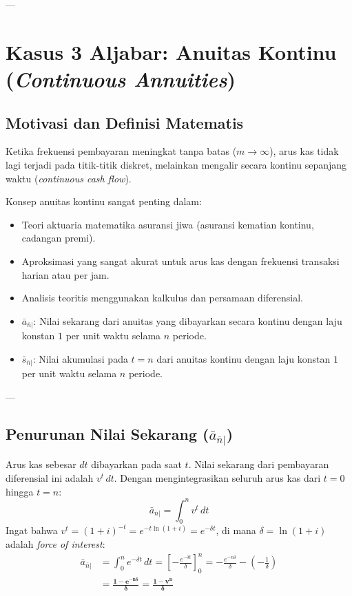 \documentclass[11pt,a4paper]{article}
\begin{document}
---

\section{Kasus 3 Aljabar: Anuitas Kontinu (\textit{Continuous Annuities})}

\subsection{Motivasi dan Definisi Matematis}
Ketika frekuensi pembayaran meningkat tanpa batas ($m \to \infty$), arus kas tidak lagi terjadi pada titik-titik diskret, melainkan mengalir secara kontinu sepanjang waktu (\textit{continuous cash flow}). 

Konsep anuitas kontinu sangat penting dalam:
\begin{itemize}
    \item Teori aktuaria matematika asuransi jiwa (asuransi kematian kontinu, cadangan premi).
    \item Aproksimasi yang sangat akurat untuk arus kas dengan frekuensi transaksi harian atau per jam.
    \item Analisis teoritis menggunakan kalkulus dan persamaan diferensial.
\end{itemize}

\begin{definitionbox}
\begin{itemize}[leftmargin=1.5em]
    \item $\bar{a}_{\overline{n}|}$: Nilai sekarang dari anuitas yang dibayarkan secara kontinu dengan laju konstan $1$ per unit waktu selama $n$ periode.
    \item $\bar{s}_{\overline{n}|}$: Nilai akumulasi pada $t = n$ dari anuitas kontinu dengan laju konstan $1$ per unit waktu selama $n$ periode.
\end{itemize}
\end{definitionbox}

---

\subsection{Penurunan Nilai Sekarang (\texorpdfstring{$\bar{a}_{\overline{n}|}$}{a\_bar\_n|})}

Arus kas sebesar $dt$ dibayarkan pada saat $t$. Nilai sekarang dari pembayaran diferensial ini adalah $v^t \, dt$. Dengan mengintegrasikan seluruh arus kas dari $t = 0$ hingga $t = n$:
\begin{equation}
    \bar{a}_{\overline{n}|} = \int_{0}^{n} v^t \, dt
\end{equation}
Ingat bahwa $v^t = (1+i)^{-t} = e^{-t \ln(1+i)} = e^{-\delta t}$, di mana $\delta = \ln(1+i)$ adalah \textit{force of interest}:
\begin{align}
    \bar{a}_{\overline{n}|} &= \int_{0}^{n} e^{-\delta t} \, dt = \left[ -\frac{e^{-\delta t}}{\delta} \right]_{0}^{n} = -\frac{e^{-n\delta}}{\delta} - \left( -\frac{1}{\delta} \right) \nonumber\\[0.4em]
    &= \mathbf{\frac{1 - e^{-n\delta}}{\delta} = \frac{1 - v^n}{\delta}}
\end{align}
\end{document}
